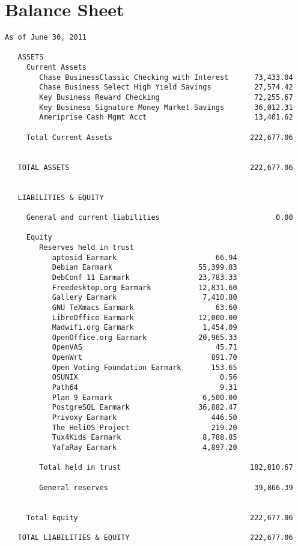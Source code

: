 \documentclass[letterpaper]{report}
\begin{document}
\section{Balance Sheet}

\begin{verbatim}
As of June 30, 2011

   ASSETS
     Current Assets
        Chase BusinessClassic Checking with Interest      73,433.04
        Chase Business Select High Yield Savings          27,574.42
        Key Business Reward Checking                      72,255.67
        Key Business Signature Money Market Savings       36,012.31
        Ameriprise Cash Mgmt Acct                         13,401.62

     Total Current Assets                                222,677.06


   TOTAL ASSETS                                          222,677.06


   LIABILITIES & EQUITY

     General and current liabilities                           0.00

     Equity
        Reserves held in trust
           aptosid Earmark                       66.94
           Debian Earmark                    55,399.83
           DebConf 11 Earmark                23,783.33
           Freedesktop.org Earmark           12,831.60
           Gallery Earmark                    7,410.80
           GNU TeXmacs Earmark                   63.60
           LibreOffice Earmark               12,000.00
           Madwifi.org Earmark                1,454.09
           OpenOffice.org Earmark            20,965.33
           OpenVAS                               45.71
           OpenWrt                              891.70
           Open Voting Foundation Earmark       153.65
           OSUNIX                                 0.56
           Path64                                 9.31
           Plan 9 Earmark                     6,500.00
           PostgreSQL Earmark                36,882.47
           Privoxy Earmark                      446.50
           The HeliOS Project                   219.20
           Tux4Kids Earmark                   8,788.85
           YafaRay Earmark                    4,897.20

        Total held in trust                              182,810.67

        General reserves                                  39,866.39


     Total Equity                                        222,677.06

   TOTAL LIABILITIES & EQUITY                            222,677.06
\end{verbatim}
\end{document}
